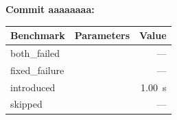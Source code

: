 
\noindent
\textbf{Commit aaaaaaaa:}

\begin{tabular}{llr}
\toprule
Benchmark & Parameters & Value \\
\midrule
both\_failed &  & --- \\
fixed\_failure &  & --- \\
introduced &  & \qty{1.00}{\second} \\
skipped &  & --- \\
\bottomrule
\end{tabular}
